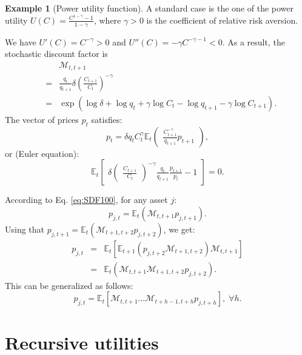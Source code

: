 \documentclass[
  12pt,
]{book}
\theoremstyle{definition}
\theoremstyle{definition}
\newtheorem{example}{Example}[chapter]
\theoremstyle{definition}
\theoremstyle{definition}
\theoremstyle{remark}
\begin{document}
\begin{example}[Power utility function]
\protect\hypertarget{exm:CCAPM}{}\label{exm:CCAPM}A standard case is the one of the power utility \(U(C) = \frac{C^{1-\gamma}-1}{1-\gamma}\), where \(\gamma>0\) is the coefficient of relative risk aversion.

We have \(U'(C) = C^{-\gamma} > 0\) and \(U''(C) = - \gamma C^{-\gamma-1} < 0\). As a result, the stochastic discount factor is
\begin{eqnarray}
&& \mathcal{M}_{t,t+1} \nonumber \\
&=&  \frac{q_t}{q_{t+1}} \delta \left(
\frac{C_{t+1}}{C_t} \right)^{-\gamma} \nonumber\\
&=& \exp(\log
\delta + \log q_t + \gamma \log  C_t - \log  q_{t+1} - \gamma
\log  C_{t+1}).\label{eq:powerutilSDF}
\end{eqnarray}
The vector of prices \(p_t\) satisfies:
\[
p_t = \delta q_t C^\gamma_t \mathbb{E}_t \left(
\begin{array}{l}
\frac{C^{-\gamma}_{t+1}}{q_{t+1}} p_{t+1}
\end{array}
\right),
\]
or (Euler equation):
\[
\mathbb{E}_t\left[
\begin{array}{l}
\delta\left(
\begin{array}{l}
\frac{C_{t+1}}{C_t}
\end{array}
\right)^{-\gamma}  \frac{q_t}{q_{t+1}}
\frac{p_{t+1}}{p_t} - 1
\end{array}
\right] = 0.
\]
\end{example}

According to Eq. \eqref{eq:SDF100}, for any asset \(j\):
\begin{equation}
p_{j,t} = \mathbb{E}_t(\mathcal{M}_{t,t+1} p_{j,t+1}).\label{eq:Mbasicpricing}
\end{equation}
Using that \(p_{j,t+1} = \mathbb{E}_t(\mathcal{M}_{t+1,t+2} p_{j,t+2})\), we get:
\begin{eqnarray*}
p_{j,t} &=& \mathbb{E}_t[\mathbb{E}_{t+1}(p_{j,t+2}\mathcal{M}_{t+1,t+2})\mathcal{M}_{t,t+1}] \\
&=& \mathbb{E}_t(\mathcal{M}_{t,t+1} \mathcal{M}_{t+1,t+2}p_{j,t+2}).
\end{eqnarray*}
This can be generalized as follows:
\[
p_{j,t} = \mathbb{E}_t[\mathcal{M}_{t,t+1} \dots \mathcal{M}_{t+h-1,t+h}p_{j,t+h}], \; \forall h.
\]

\hypertarget{recursive-utilities}{%
\section{Recursive utilities}\label{recursive-utilities}}
\end{document}
